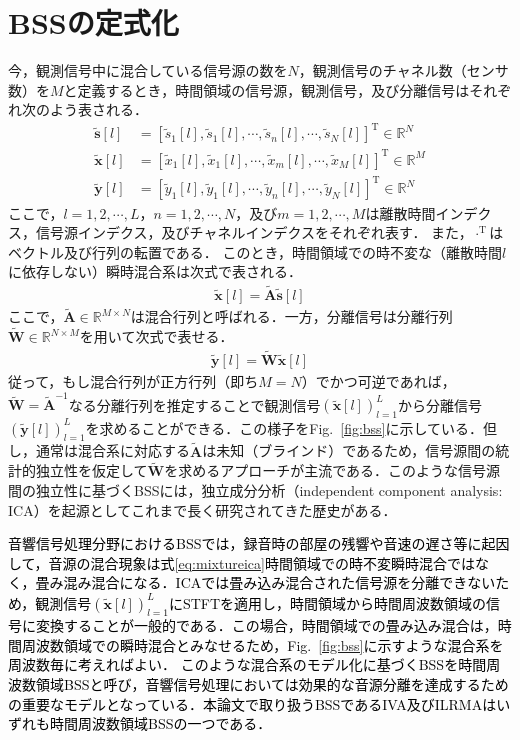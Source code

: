 \section{BSSの定式化}
\label{sec:conv:bssformularization}
今，観測信号中に混合している信号源の数を$N$，観測信号のチャネル数（センサ数）を$M$と定義するとき，時間領域の信号源，観測信号，及び分離信号はそれぞれ次のよう表される．
\begin{align}
  \tilde{\bm{s}}[l] &= [ \tilde{s}_{1}[l], \tilde{s}_{1}[l], \cdots, \tilde{s}_{n}[l], \cdots, \tilde{s}_{N}[l] ]^\mathrm{T} \in \mathbb{R}^{N} \\
  \tilde{\bm{x}}[l] &= [ \tilde{x}_{1}[l], \tilde{x}_{1}[l], \cdots, \tilde{x}_{m}[l], \cdots, \tilde{x}_{M}[l] ]^\mathrm{T} \in \mathbb{R}^{M} \\
  \tilde{\bm{y}}[l] &= [ \tilde{y}_{1}[l], \tilde{y}_{1}[l], \cdots, \tilde{y}_{n}[l], \cdots, \tilde{y}_{N}[l] ]^\mathrm{T} \in \mathbb{R}^{N} 
\end{align}
ここで，$l = 1, 2, \cdots, L$，$n = 1, 2, \cdots, N$，及び$m = 1, 2, \cdots, M$は離散時間インデクス，信号源インデクス，及びチャネルインデクスをそれぞれ表す．
また，$\cdot^\mathrm{T}$はベクトル及び行列の転置である．
このとき，時間領域での時不変な（離散時間$l$に依存しない）瞬時混合系は次式で表される．
\begin{align}
  \tilde{\bm{x}}[l] = \tilde{\bm{A}} \tilde{\bm{s}}[l] \label{eq:mixtureica}
\end{align}
ここで，$\tilde{\bm{A}} \in \mathbb{R}^{M\times N}$は混合行列と呼ばれる．一方，分離信号は分離行列$\tilde{\bm{W}} \in \mathbb{R}^{N\times M}$を用いて次式で表せる．
\begin{align}
  \tilde{\bm{y}}[l] = \tilde{\bm{W}} \tilde{\bm{x}}[l] 
\end{align}
従って，もし混合行列が正方行列（即ち$M=N$）でかつ可逆であれば，$\tilde{\bm{W}} = \tilde{\bm{A}}^{-1}$なる分離行列を推定することで観測信号$( \tilde{\bm{x}}[l] )_{l=1}^L$から分離信号$( \tilde{\bm{y}}[l] )_{l=1}^L$を求めることができる．この様子をFig.~\ref{fig:bss}に示している．但し，通常は混合系に対応する$\tilde{\bm{A}}$は未知（ブラインド）であるため，信号源間の統計的独立性を仮定して$\tilde{\bm{W}}$を求めるアプローチが主流である．このような信号源間の独立性に基づくBSSには，独立成分分析（independent component analysis: ICA）\cite{ica}を起源としてこれまで長く研究されてきた歴史がある．

\textcolor{black}{音響信号処理分野におけるBSSでは，録音時の部屋の残響や音速の遅さ等に起因して，音源の混合現象は式\eqref{eq:mixtureica}時間領域での時不変瞬時混合ではなく，畳み混み混合になる．ICAでは畳み込み混合された信号源を分離できないため，観測信号$( \tilde{\bm{x}}[l] )_{l=1}^L$にSTFTを適用し，時間領域から時間周波数領域の信号に変換することが一般的である．この場合，時間領域での畳み込み混合は，時間周波数領域での瞬時混合とみなせるため，Fig.~\ref{fig:bss}に示すような混合系を周波数毎に考えればよい．
このような混合系のモデル化に基づくBSSを時間周波数領域BSSと呼び，音響信号処理においては効果的な音源分離を達成するための重要なモデルとなっている．本論文で取り扱うBSSであるIVA及びILRMAはいずれも時間周波数領域BSSの一つである．}

